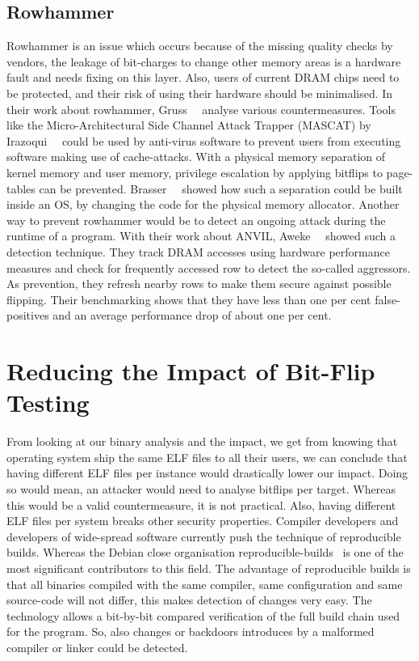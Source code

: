 \subsection{Rowhammer}

Rowhammer is an issue which occurs because of the missing quality checks by
vendors, the leakage of bit-charges to change other memory areas is a hardware
fault and needs fixing on this layer. Also, users of current DRAM chips need to
be protected, and their risk of using their hardware should be minimalised. In
their work about rowhammer, Gruss~\etal~\cite{flipinthewall} analyse various
countermeasures. Tools like the Micro-Architectural Side Channel Attack Trapper
(MASCAT) by Irazoqui~\etal~\cite{mascat} could be used by anti-virus software to
prevent users from executing software making use of cache-attacks. With a
physical memory separation of kernel memory and user memory, privilege
escalation by applying bitflips to page-tables can be prevented.
Brasser~\etal~\cite{canttouch} showed how such a separation could be built
inside an OS, by changing the code for the physical memory allocator. Another
way to prevent rowhammer would be to detect an ongoing attack during the runtime
of a program. With their work about ANVIL, Aweke~\etal~\cite{anvil} showed such
a detection technique. They track DRAM accesses using hardware performance
measures and check for frequently accessed row to detect the so-called
aggressors. As prevention, they refresh nearby rows to make them secure against
possible flipping. Their benchmarking shows that they have less than one per
cent false-positives and an average performance drop of about one per cent.

\section{Reducing the Impact of Bit-Flip Testing}

From looking at our binary analysis and the impact, we get from knowing that
operating system ship the same ELF files to all their users, we can conclude
that having different ELF files per instance would drastically lower our impact.
Doing so would mean, an attacker would need to analyse bitflips per target.
Whereas this would be a valid countermeasure, it is not practical. Also, having
different ELF files per system breaks other security properties. Compiler
developers and developers of wide-spread software currently push the technique
of reproducible builds. Whereas the Debian close organisation
reproducible-builds~\cite{reprobuilds} is one of the most significant
contributors to this field. The advantage of reproducible builds is that all
binaries compiled with the same compiler, same configuration and same
source-code will not differ, this makes detection of changes very easy. The
technology allows a bit-by-bit compared verification of the full build chain
used for the program. So, also changes or backdoors introduces by a malformed
compiler or linker could be detected.

